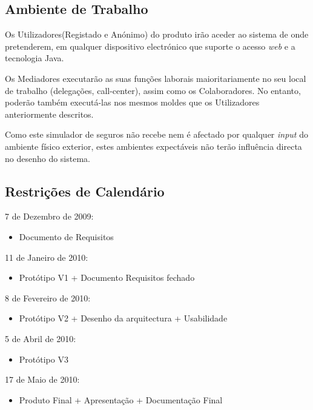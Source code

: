 \subsection{Ambiente de Trabalho}
Os Utilizadores(Registado e Anónimo) do produto irão aceder ao sistema de onde pretenderem, em qualquer dispositivo electrónico que suporte o acesso \emph{web} e a tecnologia Java.

Os Mediadores executarão as suas funções laborais maioritariamente no seu local de trabalho (delegações, call-center), assim como os Colaboradores. No entanto, poderão também executá-las nos mesmos moldes que os Utilizadores anteriormente descritos.

Como este simulador de seguros não recebe nem é afectado por qualquer \emph{input} do ambiente físico exterior, estes ambientes expectáveis não terão influência directa no desenho do sistema.

\subsection{Restrições de Calendário}
\begin{description}
\item 7 de Dezembro de 2009: 
\begin{itemize}
\item Documento de Requisitos
\end{itemize}
\item 11 de Janeiro de 2010: 
\begin{itemize}
\item Protótipo V1 + Documento Requisitos fechado
\end{itemize}
\item 8 de Fevereiro de 2010: 
\begin{itemize}
\item Protótipo V2 + Desenho da arquitectura + Usabilidade
\end{itemize}
\item 5 de Abril de 2010: 
\begin{itemize}
\item Protótipo V3
\end{itemize}
\item 17 de Maio de 2010: 
\begin{itemize}
\item Produto Final + Apresentação + Documentação Final
\end{itemize}
\end{description}


